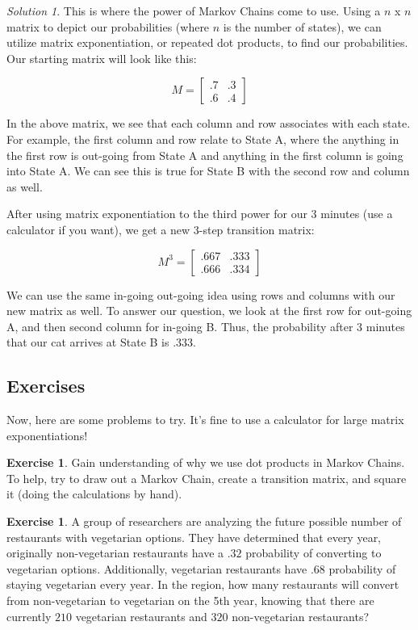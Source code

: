 \documentclass[letterpaper]{article}
\theoremstyle{definition}
\theoremstyle{remark}
\newtheorem*{solution}{Solution}
\theoremstyle{definition}
\newtheorem{exercise}[thm]{Exercise}
\begin{document}
\begin{solution}
This is where the power of Markov Chains come to use. Using a $n$ x $n$ matrix to depict our probabilities (where $n$ is the number of states), we can utilize matrix exponentiation, or repeated dot products, to find our probabilities. Our starting matrix will look like this:

\[
M=
  \begin{bmatrix}
    .7 & .3 \\
    .6 & .4 
  \end{bmatrix}
\]

\noindent
In the above matrix, we see that each column and row associates with each state. For example, the first column and row relate to State A, where the anything in the first row is out-going from State A and anything in the first column is going into State A. We can see this is true for State B with the second row and column as well.

After using matrix exponentiation to the third power for our 3 minutes (use a calculator if you want), we get a new 3-step transition matrix:

\[
M^{3}=
  \begin{bmatrix}
    .667 & .333 \\
    .666 & .334 
  \end{bmatrix}
\]

\noindent
We can use the same in-going out-going idea using rows and columns with our new matrix as well. To answer our question, we look at the first row for out-going A, and then second column for in-going B. Thus, the probability after 3 minutes that our cat arrives at State B is $.333$.
\end{solution}

\subsection*{Exercises}
Now, here are some problems to try. It's fine to use a calculator for large matrix exponentiations!

\begin{exercise}
    Gain understanding of why we use dot products in Markov Chains. To help, try to draw out a Markov Chain, create a transition matrix, and square it (doing the calculations by hand).
\end{exercise}

\begin{exercise}
    A group of researchers are analyzing the future possible number of restaurants with vegetarian options. They have determined that every year, originally non-vegetarian restaurants have a $.32$ probability of converting to vegetarian options. Additionally, vegetarian restaurants have $.68$ probability of staying vegetarian every year. In the region, how many restaurants will convert from non-vegetarian to vegetarian on the 5th year, knowing that there are currently $210$ vegetarian restaurants and $320$ non-vegetarian restaurants? 
\end{exercise}
\end{document}
